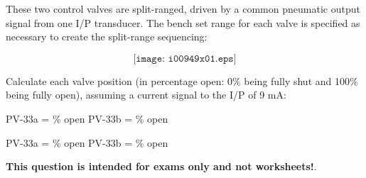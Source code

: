 

These two control valves are split-ranged, driven by a common pneumatic output signal from one I/P transducer.  The bench set range for each valve is specified as necessary to create the split-range sequencing:

$$\texttt{[image: i00949x01.eps]}$$

Calculate each valve position (in percentage open: 0\% being fully shut and 100\% being fully open), assuming a current signal to the I/P of 9 mA:

\vskip 20pt

\hskip 50pt PV-33a = \underbar{\hskip 50pt} \% open \hskip 60pt PV-33b = \underbar{\hskip 50pt} \% open







PV-33a =  \% open \hskip 100pt PV-33b =  \% open







{\bf This question is intended for exams only and not worksheets!}.


